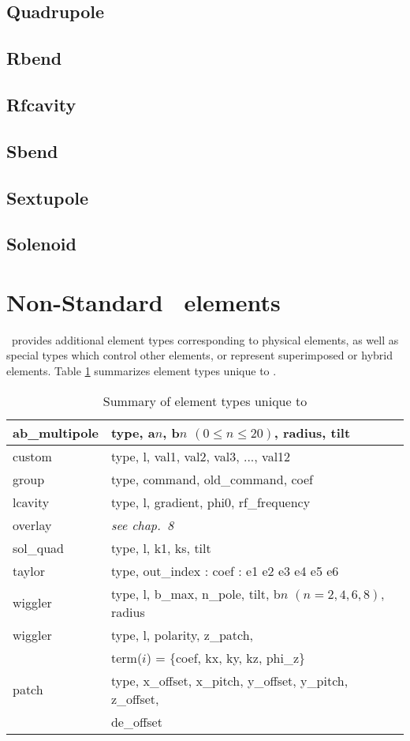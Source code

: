 \subsection{Quadrupole}
\subsection{Rbend}
\subsection{Rfcavity}
\subsection{Sbend}
\subsection{Sextupole}
\subsection{Solenoid}

\section{Non-Standard \bmad\ elements}
\bmad\ provides additional element types corresponding to physical elements, as well as special
types which control other elements, or represent superimposed or hybrid elements.
Table \ref{tab:bmad_elements} summarizes element types unique to \bmad.

\begin{table}\label{tab:bmad_elements}\center
{\tt\begin{tabular}{|l|l|} \hline
    ab\_multipole  &  type, a$n$, b$n$ $(0 \le n \le 20)$, radius, tilt \\ \hline
    custom         &  type, l, val1, val2, val3, ..., val12 \\ \hline
    group          &  type, command, old\_command, coef \\ \hline
    lcavity        &  type, l, gradient, phi0, rf\_frequency \\ \hline
    overlay        &  {\sl see chap.~8} \\ \hline
    sol\_quad      &  type, l, k1, ks, tilt \\ \hline
    taylor         &  type, {out\_index : coef : e1 e2 e3 e4 e5 e6} \\ \hline
    wiggler        &  type, l, b\_max, n\_pole, tilt, b$n$ $(n=2,4,6,8)$, radius \\ \hline
    wiggler        &  type, l, polarity, z\_patch, \\
                   &  term($i$) = $\{$coef, kx, ky, kz, phi\_z$\}$ \\ \hline
    patch          &  type, x\_offset, x\_pitch, y\_offset, y\_pitch, z\_offset, \\
                   &  de\_offset \\ \hline
\end{tabular}}
\caption{Summary of element types unique to \bmad}
\end{table}
